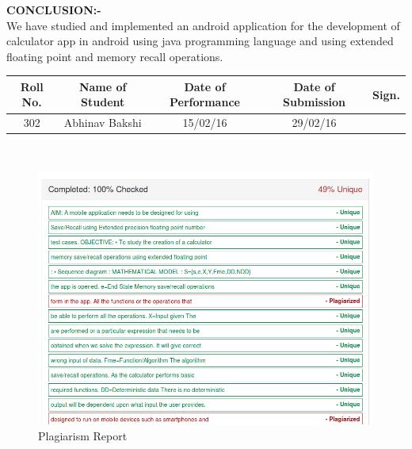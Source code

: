 \documentclass[a4paper,12pt]{article}
\begin{document}
\noindent \textbf{CONCLUSION:- }	\\
We have studied and implemented an android application for the development of calculator app in android using java programming language and using extended floating point and memory recall operations.

\begin{center}
\begin{tabular}
{|c|c|c|c|c|}\hline
{\bf Roll No.}		&{\bf Name of Student}	&{\bf Date of Performance}  				&{\bf Date of Submission}	&{\bf Sign.}  \\    \hline
{302}	&	{Abhinav Bakshi}& 	{15/02/16}	&  {29/02/16} \\ \hline
\end{tabular}\\ 
\end{center}


\begin{figure}[htb!]
	\centering
	\includegraphics[scale = 0.80]{Trig.png}
	\caption{Plagiarism Report }
	\label{Plagiarism Report}
\end{figure}
\end{document}
